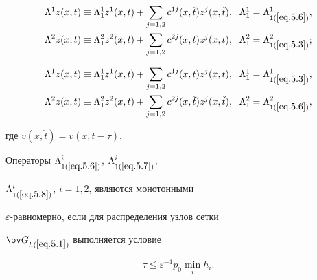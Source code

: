 \begin{equation}


\label{eq.5.7}


\begin{split}


\Lambda^1 z(x, t)&\equiv \Lambda^1_1 z^1(x, t)+\sum_{j=1, 2} c^{1j}(x,


\check{t}) z^j(x, \check{t}),\ \;


\Lambda^1_1=\Lambda^1_{1(\ref{eq.5.6})},\\


\Lambda^2 z(x, t)&\equiv \Lambda^2_1 z^2(x, t)+\sum_{j=1, 2} c^{2j}(x,t)


z^j(x, t),\ \; \Lambda^2_1=\Lambda^2_{1(\ref{eq.5.3})};


\end{split}


\end{equation}


\begin{equation}


\label{eq.5.8}


\begin{split}


\Lambda^1 z(x, t)&\equiv \Lambda^1_1 z^1(x,t)+\sum_{j=1, 2} c^{1j}(x,t)


z^j(x, t), \ \; \Lambda^1_1=\Lambda^1_{1(\ref{eq.5.3})}, \\


\Lambda^2 z(x,t)&\equiv\Lambda^2_1 z^2(x,t)+\sum_{j=1,2}c^{2j}(x,\check{t})


z^j(x, \check{t}),\ \; \Lambda^2_1=\Lambda^2_{1(\ref{eq.5.6})},


\end{split}


\end{equation}


где $v(x, \check{t})=v(x, t-\tau)$.





Операторы $\Lambda^i_{1(\ref{eq.5.6})}$, $\Lambda^i_{1(\ref{eq.5.7})}$,


$\Lambda^i_{1(\ref{eq.5.8})}$, $i=1,2$, являются монотонными


$\varepsilon$-равномерно, если для распределения узлов сетки


$\ov G_{h(\ref{eq.5.1})}$ выполняется условие\vspace{-1mm}


\begin{equation}


\label{eq.5.9}


\tau\le \varepsilon^{-1} p_0  \min_i h_i.


\end{equation}


